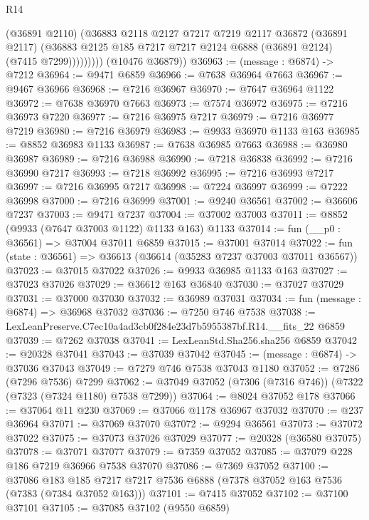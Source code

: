 \begin{lexlean}{R14}
\begin{coremodule}
                  (@36891 @2110)
                  (@36883
                    @2118
                    @2127
                    @7217
                    @7219
                    @2117
                    @36872
                    (@36891 @2117)
                    (@36883 @2125 @185 @7217 @7217 @2124 @6888 (@36891 @2124) (@7415 @7299)))))))))
      (@10476 @36879))
@36963 := (message : @6874) -> @7212
@36964 := @9471 @6859
@36966 := @7638 @36964 @7663
@36967 := @9467 @36966
@36968 := @7216 @36967
@36970 := @7647 @36964 @1122
@36972 := @7638 @36970 @7663
@36973 := @7574 @36972
@36975 := @7216 @36973 @7220
@36977 := @7216 @36975 @7217
@36979 := @7216 @36977 @7219
@36980 := @7216 @36979
@36983 := @9933 @36970 @1133 @163
@36985 := @8852 @36983 @1133
@36987 := @7638 @36985 @7663
@36988 := @36980 @36987
@36989 := @7216 @36988
@36990 := @7218 @36838
@36992 := @7216 @36990 @7217
@36993 := @7218 @36992
@36995 := @7216 @36993 @7217
@36997 := @7216 @36995 @7217
@36998 := @7224 @36997
@36999 := @7222 @36998
@37000 := @7216 @36999
@37001 := @9240 @36561
@37002 := @36606 @7237
@37003 := @9471 @7237
@37004 := @37002 @37003
@37011 := @8852 (@9933 (@7647 @37003 @1122) @1133 @163) @1133
@37014 := fun (__p0 : @36561) => @37004 @37011 @6859
@37015 := @37001 @37014
@37022 := fun (state : @36561) => @36613 (@36614 (@35283 @7237 @37003 @37011 @36567))
@37023 := @37015 @37022
@37026 := @9933 @36985 @1133 @163
@37027 := @37023 @37026
@37029 := @36612 @163 @36840
@37030 := @37027 @37029
@37031 := @37000 @37030
@37032 := @36989 @37031
@37034 := fun (message : @6874) => @36968 @37032
@37036 := @7250 @746 @7538
@37038 := LexLeanPreserve.C7ec10a4ad3cb0f284e23d7b5955387bf.R14.__fits_22 @6859
@37039 := @7262 @37038
@37041 := LexLeanStd.Sha256.sha256 @6859
@37042 := @20328 @37041
@37043 := @37039 @37042
@37045 := (message : @6874) -> @37036 @37043
@37049 := @7279 @746 @7538 @37043 @1180
@37052 := @7286 (@7296 @7536) @7299
@37062 := @37049 @37052 (@7306 (@7316 @746)) (@7322 (@7323 (@7324 @1180) @7538 @7299))
@37064 := @8024 @37052 @178
@37066 := @37064 @11 @230
@37069 := @37066 @1178 @36967 @37032
@37070 := @237 @36964
@37071 := @37069 @37070
@37072 := @9294 @36561
@37073 := @37072 @37022
@37075 := @37073 @37026 @37029
@37077 := @20328 (@36580 @37075)
@37078 := @37071 @37077
@37079 := @7359 @37052
@37085 := @37079 @228 @186 @7219 @36966 @7538 @37070
@37086 := @7369 @37052
@37100 := @37086
    @183
    @185
    @7217
    @7217
    @7536
    @6888
    (@7378 @37052 @163 @7536 (@7383 (@7384 @37052 @163)))
@37101 := @7415 @37052
@37102 := @37100 @37101
@37105 := @37085 @37102 (@9550 @6859)

\end{coremodule}
\end{lexlean}
